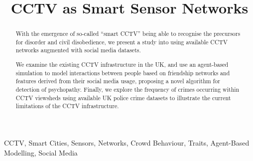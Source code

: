 \documentclass[conference]{IEEEtran}
\begin{document}
%
\title{CCTV as Smart Sensor Networks}


\author{
}





\maketitle


\begin{abstract}
With the emergence of so-called ``smart CCTV'' being able to recognise
the precursors for disorder and civil disobedience, we present a study
into using available CCTV networks augmented with social media
datasets.

We examine the existing CCTV infrastructure in the UK, and use an
agent-based simulation to model interactions between people based on
friendship networks and features derived from their social media
usage, proposing a novel algorithm for detection of
psychopathy. Finally, we explore the frequency of crimes occurring
within CCTV viewsheds using available UK police crime datasets to
illustrate the current limitations of the CCTV infrastructure.
\end{abstract}

%

\begin{IEEEkeywords}
CCTV, Smart Cities, Sensors, Networks, Crowd Behaviour, Traits, Agent-Based
Modelling, Social Media
\end{IEEEkeywords}
\end{document}
